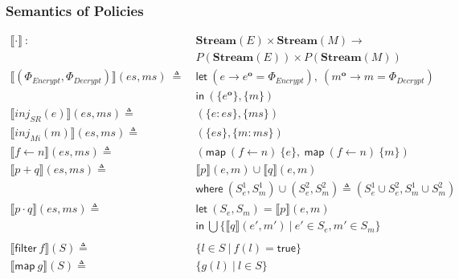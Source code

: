 \documentclass[12pt, letterpaper]{article}
\newcommand\interp[1]{\llbracket #1 \rrbracket}
\newcommand\obf[1]{#1^\mathbf{o}}
\begin{document}
      \subsubsection{Semantics of Policies}\label{sec:spec:sem:pol}
          {\centering
          \begin{align*} 
            \interp { \cdot }\ 
              :\ \ &
              \mathbf{Stream}(E)\times \mathbf{Stream}(M) \rightarrow \\
              & P(\mathbf{Stream}(E))\times P(\mathbf{Stream}(M)) 
              \\
            \interp {(\Phi_{Encrypt}, \Phi_{Decrypt})}(es, ms)\
              \triangleq\
              & \mathsf{let}\ (e \rightarrow \obf{e} = \Phi_{Encrypt}),
                            \ (\obf{m} \rightarrow m = \Phi_{Decrypt})\\
              & \mathsf{in}\
              (\{\obf{e}\}, \{m\})
              \\
            \interp { inj_{SR}(e) }(es, ms)
              \triangleq\ &
              (\{e : es\}, \{ms\}) 
              \\
            \interp { inj_{Mi}(m) }(es, ms)
              \triangleq\ &
              (\{es\},\{m : ms\})
              \\
            \interp { f \leftarrow n }(es, ms)
              \triangleq\ &
              (\mathsf{map}\ (f\leftarrow n)\ \{e\},\
               \mathsf{map}\ (f\leftarrow n)\ \{m\})
              \\ %
            \interp { p + q }(es, ms)
              \triangleq\ &
              \interp { p }(e, m)\cup
              \interp { q }(e, m) \\
              &\mathsf{where}\ (S_e^1, S_m^1)\cup (S_e^2, S_m^2)\triangleq
                (S_e^1\cup S_e^2, S_m^1\cup S_m^2)\\
            \interp { p \cdot q }(es, ms)
              \triangleq\ &
              \mathsf{let}\ (S_e, S_m) = \interp{p}(e, m)\\
              &\mathsf{in}\ \bigcup \{\interp{q}(e',m')\ |\ e'\in S_e, m'\in S_m\}\\
              \\
            \interp{\mathsf{filter}\ f}(S)
              \triangleq\ & \{l \in S\ |\ f(l) = \mathsf{true}\}\\
            \interp{\mathsf{map}\ g}(S)
              \triangleq\ &
              \{ g(l)\ |\ l\in S \} 
          \end{align*}}
\end{document}
